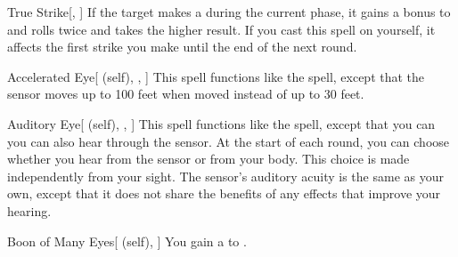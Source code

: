\lowercase{\hypertarget{spell:True Strike}{}}\label{spell:True Strike}
\begin{freeability}[\nth{1}]{\hypertarget{spell:True Strike}{True Strike}}[, ]
If the target makes a  during the current phase,
it gains a  bonus to  and rolls twice and takes the higher result.
If you cast this spell on yourself, it affects the first strike you make until the end of the next round.
\end{freeability}
\vspace{0.25em}



\lowercase{\hypertarget{spell:Accelerated Eye}{}}\label{spell:Accelerated Eye}
\begin{attuneability}[\nth{2}]{\hypertarget{spell:Accelerated Eye}{Accelerated Eye}}[ (self), , ]
This spell functions like the  spell, except that the sensor moves up to 100 feet when moved instead of up to 30 feet.
\end{attuneability}
\vspace{0.25em}



\lowercase{\hypertarget{spell:Auditory Eye}{}}\label{spell:Auditory Eye}
\begin{attuneability}[\nth{2}]{\hypertarget{spell:Auditory Eye}{Auditory Eye}}[ (self), , ]
This spell functions like the  spell, except that you can you can also hear through the sensor.
At the start of each round, you can choose whether you hear from the sensor or from your body.
This choice is made independently from your sight.
The sensor's auditory acuity is the same as your own, except that it does not share the benefits of any  effects that improve your hearing.
\end{attuneability}
\vspace{0.25em}



\lowercase{\hypertarget{spell:Boon of Many Eyes}{}}\label{spell:Boon of Many Eyes}
\begin{attuneability}[\nth{2}]{\hypertarget{spell:Boon of Many Eyes}{Boon of Many Eyes}}[ (self), ]
You gain a   to .
\end{attuneability}
\vspace{0.25em}




